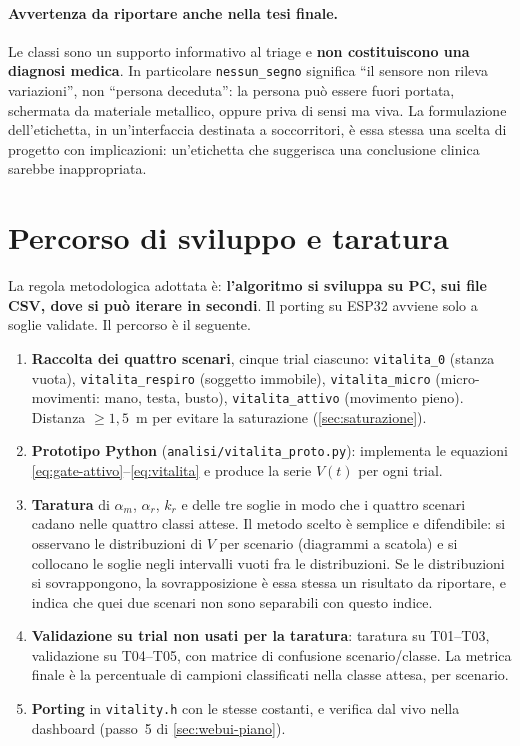 \paragraph{Avvertenza da riportare anche nella tesi finale.} Le classi sono un
supporto informativo al triage e \textbf{non costituiscono una diagnosi medica}. In
particolare \texttt{nessun\_segno} significa ``il sensore non rileva variazioni'', non
``persona deceduta'': la persona può essere fuori portata, schermata da materiale
metallico, oppure priva di sensi ma viva. La formulazione dell'etichetta, in
un'interfaccia destinata a soccorritori, è essa stessa una scelta di progetto con
implicazioni: un'etichetta che suggerisca una conclusione clinica sarebbe
inappropriata.

\section{Percorso di sviluppo e taratura}
\label{sec:vitalita-taratura}

La regola metodologica adottata è: \textbf{l'algoritmo si sviluppa su PC, sui file
CSV, dove si può iterare in secondi}. Il porting su ESP32 avviene solo a soglie
validate. Il percorso è il seguente.

\begin{enumerate}[leftmargin=1.8em,itemsep=4pt]
  \item \textbf{Raccolta dei quattro scenari}, cinque trial ciascuno:
        \texttt{vitalita\_0} (stanza vuota), \texttt{vitalita\_respiro} (soggetto
        immobile), \texttt{vitalita\_micro} (micro-movimenti: mano, testa, busto),
        \texttt{vitalita\_attivo} (movimento pieno). Distanza $\geq 1{,}5$~m per
        evitare la saturazione (\cref{sec:saturazione}).
  \item \textbf{Prototipo Python} (\texttt{analisi/vitalita\_proto.py}): implementa
        le equazioni \eqref{eq:gate-attivo}--\eqref{eq:vitalita} e produce la serie
        $V(t)$ per ogni trial.
  \item \textbf{Taratura} di $\alpha_m$, $\alpha_r$, $k_r$ e delle tre soglie in modo
        che i quattro scenari cadano nelle quattro classi attese. Il metodo scelto è
        semplice e difendibile: si osservano le distribuzioni di $V$ per scenario
        (diagrammi a scatola) e si collocano le soglie negli intervalli vuoti fra le
        distribuzioni. Se le distribuzioni si sovrappongono, la sovrapposizione è
        essa stessa un risultato da riportare, e indica che quei due scenari non sono
        separabili con questo indice.
  \item \textbf{Validazione su trial non usati per la taratura}: taratura su
        T01--T03, validazione su T04--T05, con matrice di confusione
        scenario/classe. La metrica finale è la percentuale di campioni classificati
        nella classe attesa, per scenario.
  \item \textbf{Porting} in \texttt{vitality.h} con le stesse costanti, e verifica
        dal vivo nella dashboard (passo~5 di \cref{sec:webui-piano}).
\end{enumerate}

